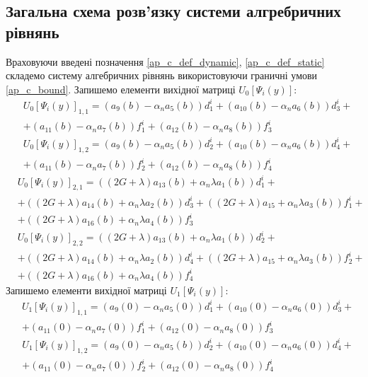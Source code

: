 \subsection*{Загальна схема розв'язку системи алгребричних рівнянь}
Враховуючи введені позначення \eqref{ap_c_def_dynamic}, \eqref{ap_c_def_static} складемо систему алгебричних рівнянь використовуючи граничні умови \eqref{ap_c_bound}.
Запишемо елементи вихідної матриці $U_0\left[ \Psi_i(y) \right]$:
\begin{align*}
    &U_0\left[ \Psi_i(y) \right]_{1,1} = (a_9(b) - \alpha_n a_5(b)) d_1^i + (a_{10}(b) - \alpha_n a_6(b)) d_3^i + \\
    &+ (a_{11}(b) - \alpha_n a_7(b)) f_1^i + (a_{12}(b) - \alpha_n a_8(b)) f_3^i 
\end{align*}
\begin{align*}
    &U_0\left[ \Psi_i(y) \right]_{1,2} = (a_9(b) - \alpha_n a_5(b)) d_2^i + (a_{10}(b) - \alpha_n a_6(b)) d_4^i + \\
    &+ (a_{11}(b) - \alpha_n a_7(b)) f_2^i + (a_{12}(b) - \alpha_n a_8(b)) f_4^i 
\end{align*}
\begin{align*}
    &U_0\left[ \Psi_i(y) \right]_{2,1} = ((2G + \lambda) a_{13}(b) + \alpha_n \lambda a_1(b)) d_1^i + \\ 
    &+ ((2G + \lambda) a_{14}(b) + \alpha_n \lambda a_2(b)) d_3^i + ((2G + \lambda)a_{15} + \alpha_n \lambda a_3(b)) f_1^i + \\ 
    &+ ((2G + \lambda)a_{16}(b) + \alpha_n \lambda a_4(b)) f_3^i 
\end{align*}
\begin{align*}
    &U_0\left[ \Psi_i(y) \right]_{2,2} = ((2G + \lambda) a_{13}(b) + \alpha_n \lambda a_1(b)) d_2^i + \\
    &+ ((2G + \lambda) a_{14}(b) + \alpha_n \lambda a_2(b)) d_4^i + ((2G + \lambda)a_{15} + \alpha_n \lambda a_3(b)) f_2^i + \\
    &+ ((2G + \lambda)a_{16}(b) + \alpha_n \lambda a_4(b)) f_4^i 
\end{align*}
Запишемо елементи вихідної матриці $U_1\left[ \Psi_i(y) \right]$:
\begin{align*}
    &U_1\left[ \Psi_i(y) \right]_{1,1} = (a_9(0) - \alpha_n a_5(0)) d_1^i + (a_{10}(0) - \alpha_n a_6(0)) d_3^i + \\
    &+ (a_{11}(0) - \alpha_n a_7(0)) f_1^i + (a_{12}(0) - \alpha_n a_8(0)) f_3^i 
\end{align*}
\begin{align*}
    &U_1\left[ \Psi_i(y) \right]_{1,2} = (a_9(0) - \alpha_n a_5(b)) d_2^i + (a_{10}(0) - \alpha_n a_6(0)) d_4^i + \\
    &+ (a_{11}(0) - \alpha_n a_7(0)) f_2^i + (a_{12}(0) - \alpha_n a_8(0)) f_4^i 
\end{align*}
